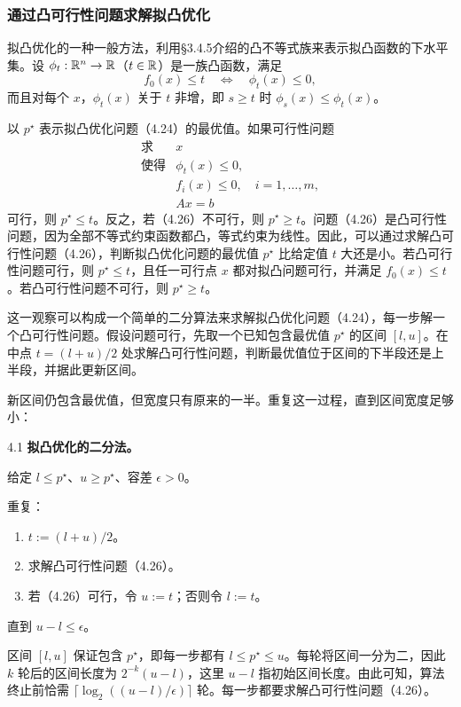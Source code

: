 \subsubsection*{通过凸可行性问题求解拟凸优化}
拟凸优化的一种一般方法，利用§3.4.5介绍的凸不等式族来表示拟凸函数的下水平集。设 $\phi_t:\mathbb R^n\to\mathbb R$（$t\in\mathbb R$）是一族凸函数，满足
\[
f_0(x)\le t\quad\Longleftrightarrow\quad\phi_t(x)\le0,
\]
而且对每个 $x$，$\phi_t(x)$ 关于 $t$ 非增，即 $s\ge t$ 时 $\phi_s(x)\le\phi_t(x)$。

以 $p^\star$ 表示拟凸优化问题（4.24）的最优值。如果可行性问题
\begin{equation}
\begin{array}{ll}
\text{求}&x\\
\text{使得}&\phi_t(x)\le0,\\
&f_i(x)\le0,\quad i=1,\ldots,m,\\
&Ax=b
\end{array}\tag{4.26}
\end{equation}
可行，则 $p^\star\le t$。反之，若（4.26）不可行，则 $p^\star\ge t$。问题（4.26）是凸可行性问题，因为全部不等式约束函数都凸，等式约束为线性。因此，可以通过求解凸可行性问题（4.26），判断拟凸优化问题的最优值 $p^\star$ 比给定值 $t$ 大还是小。若凸可行性问题可行，则 $p^\star\le t$，且任一可行点 $x$ 都对拟凸问题可行，并满足 $f_0(x)\le t$。若凸可行性问题不可行，则 $p^\star\ge t$。

这一观察可以构成一个简单的二分算法来求解拟凸优化问题（4.24），每一步解一个凸可行性问题。假设问题可行，先取一个已知包含最优值 $p^\star$ 的区间 $[l,u]$。在中点 $t=(l+u)/2$ 处求解凸可行性问题，判断最优值位于区间的下半段还是上半段，并据此更新区间。

新区间仍包含最优值，但宽度只有原来的一半。重复这一过程，直到区间宽度足够小：

\begin{origalgorithm}{4.1}
\textbf{拟凸优化的二分法。}

给定 $l\le p^\star$、$u\ge p^\star$、容差 $\epsilon>0$。

重复：
\begin{enumerate}
\item $t:=(l+u)/2$。
\item 求解凸可行性问题（4.26）。
\item 若（4.26）可行，令 $u:=t$；否则令 $l:=t$。
\end{enumerate}
直到 $u-l\le\epsilon$。
\end{origalgorithm}

区间 $[l,u]$ 保证包含 $p^\star$，即每一步都有 $l\le p^\star\le u$。每轮将区间一分为二，因此 $k$ 轮后的区间长度为 $2^{-k}(u-l)$，这里 $u-l$ 指初始区间长度。由此可知，算法终止前恰需 $\lceil\log_2((u-l)/\epsilon)\rceil$ 轮。每一步都要求解凸可行性问题（4.26）。

